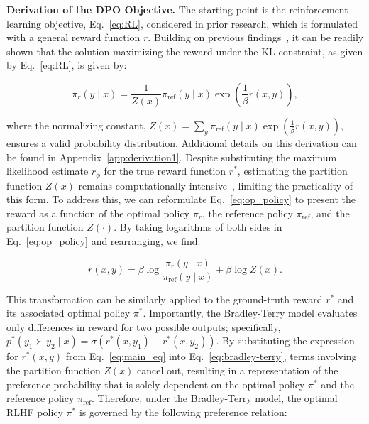 \textbf{Derivation of the DPO Objective.} The starting point is the reinforcement learning objective, Eq.~\ref{eq:RL}, considered in prior research, which is formulated with a general reward function $r$. Building on previous findings~\citep{peters2007reinforcement, peng2019advantage, korbak2022reinforcement, go2023aligning}, it can be readily shown that the solution maximizing the reward under the KL constraint, as given by Eq.~\ref{eq:RL}, is given by:

\begin{equation}\label{eq:op_policy}
    \pi_r(y\mid x) = \frac{1}{Z(x)}\pi_\text{ref}(y\mid x)\exp\left(\frac{1}{\beta}r(x, y)\right),
\end{equation}

where the normalizing constant, $Z(x) =\sum_{y}\pi_\text{ref}(y\mid x)\exp\left(\frac{1}{\beta}r(x, y)\right)$, ensures a valid probability distribution. Additional details on this derivation can be found in Appendix~\ref{app:derivation1}. Despite substituting the maximum likelihood estimate $r_{\phi}$ for the true reward function $r^*$, estimating the partition function $Z(x)$ remains computationally intensive~\citep{korbak2022reinforcement, go2023aligning}, limiting the practicality of this form. To address this, we can reformulate Eq.~\ref{eq:op_policy} to present the reward as a function of the optimal policy $\pi_r$, the reference policy $\pi_\text{ref}$, and the partition function $Z(\cdot)$. By taking logarithms of both sides in Eq.~\ref{eq:op_policy} and rearranging, we find:

\begin{equation}\label{eq:main_eq}
    r(x,y) =\beta \log \frac{\pi_r(y\mid x)}{\pi_\text{ref}(y\mid x)} + \beta \log Z(x).
\end{equation}

This transformation can be similarly applied to the ground-truth reward $r^*$ and its associated optimal policy $\pi^*$. Importantly, the Bradley-Terry model evaluates only differences in reward for two possible outputs; specifically, ${p^*(y_1 \succ y_2 \mid x) = \sigma(r^*(x, y_1) - r^*(x, y_2))}$. By substituting the expression for $r^*(x,y)$ from Eq.~\ref{eq:main_eq} into Eq.~\ref{eq:bradley-terry}, terms involving the partition function $Z(x)$ cancel out, resulting in a representation of the preference probability that is solely dependent on the optimal policy $\pi^*$ and the reference policy $\pi_\text{ref}$. Therefore, under the Bradley-Terry model, the optimal RLHF policy $\pi^*$ is governed by the following preference relation:

